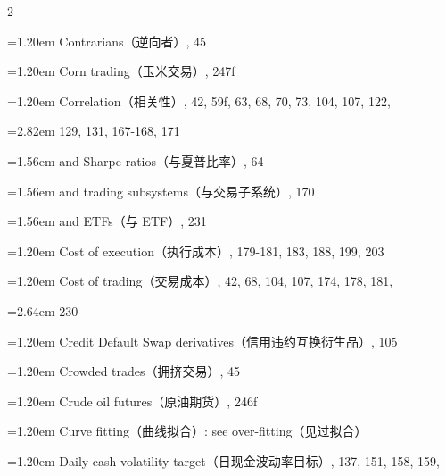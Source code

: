 {\begin{multicols}{2}
\par \noindent\hangindent=1.20em\hspace*{0.00em} Contrarians（逆向者）, 45
\par \noindent\hangindent=1.20em\hspace*{0.00em} Corn trading（玉米交易）, 247f
\par \noindent\hangindent=1.20em\hspace*{0.00em} Correlation（相关性）, 42, 59f, 63, 68, 70, 73, 104, 107, 122,
\par \noindent\hangindent=2.82em\hspace*{1.62em} 129, 131, 167-168, 171
\par \noindent\hangindent=1.56em\hspace*{0.36em} and Sharpe ratios（与夏普比率）, 64
\par \noindent\hangindent=1.56em\hspace*{0.36em} and trading subsystems（与交易子系统）, 170
\par \noindent\hangindent=1.56em\hspace*{0.36em} and ETFs（与 ETF）, 231
\par \noindent\hangindent=1.20em\hspace*{0.00em} Cost of execution（执行成本）, 179-181, 183, 188, 199, 203
\par \noindent\hangindent=1.20em\hspace*{0.00em} Cost of trading（交易成本）, 42, 68, 104, 107, 174, 178, 181,
\par \noindent\hangindent=2.64em\hspace*{1.44em} 230
\par \noindent\hangindent=1.20em\hspace*{0.00em} Credit Default Swap derivatives（信用违约互换衍生品）, 105
\par \noindent\hangindent=1.20em\hspace*{0.00em} Crowded trades（拥挤交易）, 45
\par \noindent\hangindent=1.20em\hspace*{0.00em} Crude oil futures（原油期货）, 246f
\par \noindent\hangindent=1.20em\hspace*{0.00em} Curve fitting（曲线拟合）: see over-fitting（见过拟合）
\par \noindent\hangindent=1.20em\hspace*{0.00em} Daily cash volatility target（日现金波动率目标）, 137, 151, 158, 159,

\end{multicols}}
